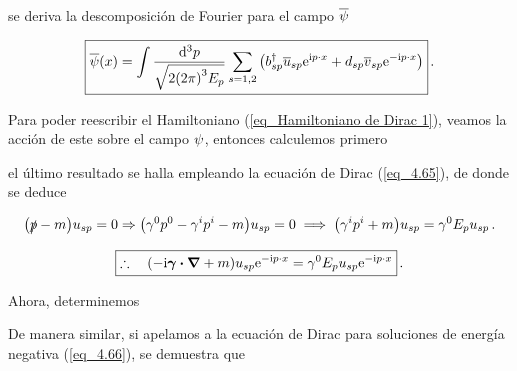 se deriva la  descomposición de Fourier para el campo $\overline{\psi}$
\newcommand{\Obpsi}{\bpsi}

\begin{equation}
	\boxed{ \Obpsi (x)  =\int \frac{\dd[3]{p}}{ \sqrt{2\qty( 2\pi )^3 E_p }} \sum_{s=1,2} \qty(\Ob^\dag_{sp}  \overline{u}_{sp}  \ee^{\ii p \cdot x} +  \Od_{sp} \overline{v}_{sp} \ee^{-\ii p\cdot x } )  } \, .
\end{equation}

Para poder reescribir el Hamiltoniano (\ref{eq_Hamiltoniano de Dirac 1}), veamos la acción de este sobre el campo $\psi$, entonces calculemos primero


el último resultado se halla empleando la ecuación de Dirac (\ref{eq_4.65}), de donde se deduce

\begin{equation}
	\qty(\slashed{p} - m )u_{sp} = 0 \Rightarrow \qty(\gamma^0 p^0 - \gamma^i p^i - m ) u_{sp} =0 \implies \qty(\gamma^i p^i + m ) u_{sp} = \gamma^0 E_p u_{sp}\, .
\end{equation}

\begin{equation}
	\boxed{\therefore \quad \qty(-\ii \vb*{\gamma} \vdot \grad +m) u_{sp} \ee^{-\ii p \cdot x}  = \gamma^0 E_p u_{sp}  \ee^{-\ii p \cdot x}  } \, .
	\label{eq_primera parte del Hamiltoniano de Dirac}
\end{equation}

Ahora, determinemos


De manera similar, si apelamos a la ecuación de Dirac para soluciones de energía negativa (\ref{eq_4.66}), se demuestra que

